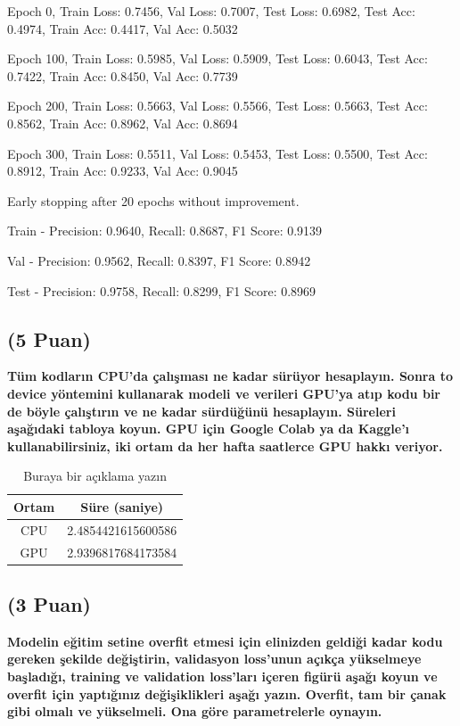 \documentclass[11pt]{article}
\begin{document}
Epoch 0, Train Loss: 0.7456, Val Loss: 0.7007, Test Loss: 0.6982, Test Acc: 0.4974, Train Acc: 0.4417, Val Acc: 0.5032

Epoch 100, Train Loss: 0.5985, Val Loss: 0.5909, Test Loss: 0.6043, Test Acc: 0.7422, Train Acc: 0.8450, Val Acc: 0.7739

Epoch 200, Train Loss: 0.5663, Val Loss: 0.5566, Test Loss: 0.5663, Test Acc: 0.8562, Train Acc: 0.8962, Val Acc: 0.8694

Epoch 300, Train Loss: 0.5511, Val Loss: 0.5453, Test Loss: 0.5500, Test Acc: 0.8912, Train Acc: 0.9233, Val Acc: 0.9045

Early stopping after 20 epochs without improvement.

Train - Precision: 0.9640, Recall: 0.8687, F1 Score: 0.9139

Val - Precision: 0.9562, Recall: 0.8397, F1 Score: 0.8942

Test - Precision: 0.9758, Recall: 0.8299, F1 Score: 0.8969


\subsection{(5 Puan)} \textbf{Tüm kodların CPU'da çalışması ne kadar sürüyor hesaplayın. Sonra to device yöntemini kullanarak modeli ve verileri GPU'ya atıp kodu bir de böyle çalıştırın ve ne kadar sürdüğünü hesaplayın. Süreleri aşağıdaki tabloya koyun. GPU için Google Colab ya da Kaggle'ı kullanabilirsiniz, iki ortam da her hafta saatlerce GPU hakkı veriyor.}

\begin{table}[ht!]
    \centering
    \caption{Buraya bir açıklama yazın}
    \begin{tabular}{c|c}
        Ortam & Süre (saniye) \\\hline
        CPU & 2.4854421615600586 \\
        GPU & 2.9396817684173584\\
    \end{tabular}
    \label{tab:my_table}
\end{table}

\subsection{(3 Puan)} \textbf{Modelin eğitim setine overfit etmesi için elinizden geldiği kadar kodu gereken şekilde değiştirin, validasyon loss'unun açıkça yükselmeye başladığı, training ve validation loss'ları içeren figürü aşağı koyun ve overfit için yaptığınız değişiklikleri aşağı yazın. Overfit, tam bir çanak gibi olmalı ve yükselmeli. Ona göre parametrelerle oynayın.}
\end{document}
